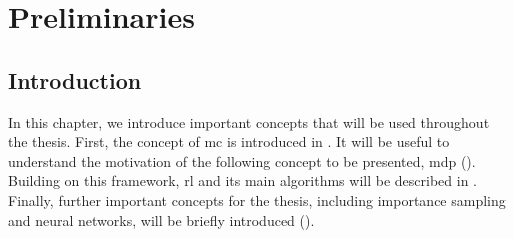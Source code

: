 \chapter{Preliminaries}
\label{chap:prelim}

\section{Introduction}
In this chapter, we introduce important concepts that will be used throughout the thesis. 
First, the concept of \glsdesc{mc} is introduced in . 
It will be useful to understand the motivation of the following concept to be presented, \glsdesc{mdp} ().
Building on this framework, \gls{rl} and its main algorithms will be described in .
Finally, further important concepts for the thesis, including importance sampling and neural networks, will be briefly introduced ().








